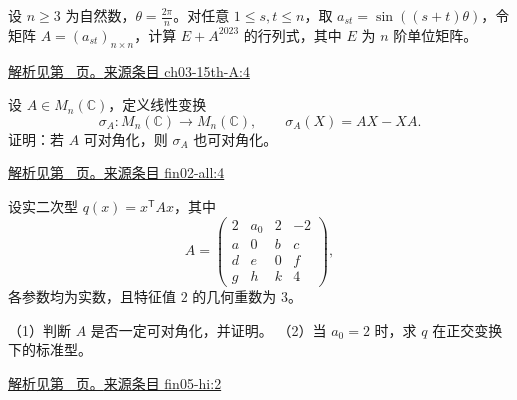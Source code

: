 \documentclass[UTF8,12pt,a4paper,fontset=fandol]{ctexart}
\begin{document}
\begin{example}\label{ex:ch03-15th-A:4}

设 $n \geq 3$ 为自然数，$\theta = \frac{2\pi}{n}$。对任意 $1 \leq s,t \leq n$，取 $a_{st} = \sin((s+t)\theta)$，令矩阵 $A = \left(a_{st}\right)_{n \times n}$，计算 $E + A^{2023}$ 的行列式，其中 $E$ 为 $n$ 阶单位矩阵。

\par\hyperref[ans:ch03-15th-A:4]{解析见第~\pageref{ans:ch03-15th-A:4} 页。}\quad\href{https://github.com/lzxcr/cmc-mathematics/blob/64916fa1fdbc3e444a652eca204d5669058ee321/src/problems/preliminary/15/04.md}{来源条目 ch03-15th-A:4}

\end{example}

\begin{example}\label{ex:fin02-all:4}

设 $A\in M_n(\mathbb C)$，定义线性变换
\[
\sigma_A:M_n(\mathbb C)\to M_n(\mathbb C),\qquad
\sigma_A(X)=AX-XA.
\]
证明：若 $A$ 可对角化，则 $\sigma_A$ 也可对角化。

\par\hyperref[ans:fin02-all:4]{解析见第~\pageref{ans:fin02-all:4} 页。}\quad\href{https://github.com/lzxcr/cmc-mathematics/blob/64916fa1fdbc3e444a652eca204d5669058ee321/src/problems/finals/02/04.md}{来源条目 fin02-all:4}

\end{example}

\begin{example}\label{ex:fin05-hi:2}

设实二次型 $q(x)=x^{\mathsf T}Ax$，其中
\[
A=\begin{pmatrix}
2&a_0&2&-2\\
a&0&b&c\\
d&e&0&f\\
g&h&k&4
\end{pmatrix},
\]
各参数均为实数，且特征值 $2$ 的几何重数为 $3$。

（1）判断 $A$ 是否一定可对角化，并证明。
（2）当 $a_0=2$ 时，求 $q$ 在正交变换下的标准型。

\par\hyperref[ans:fin05-hi:2]{解析见第~\pageref{ans:fin05-hi:2} 页。}\quad\href{https://github.com/lzxcr/cmc-mathematics/blob/64916fa1fdbc3e444a652eca204d5669058ee321/src/problems/finals/05/02.md}{来源条目 fin05-hi:2}

\end{example}
\end{document}
